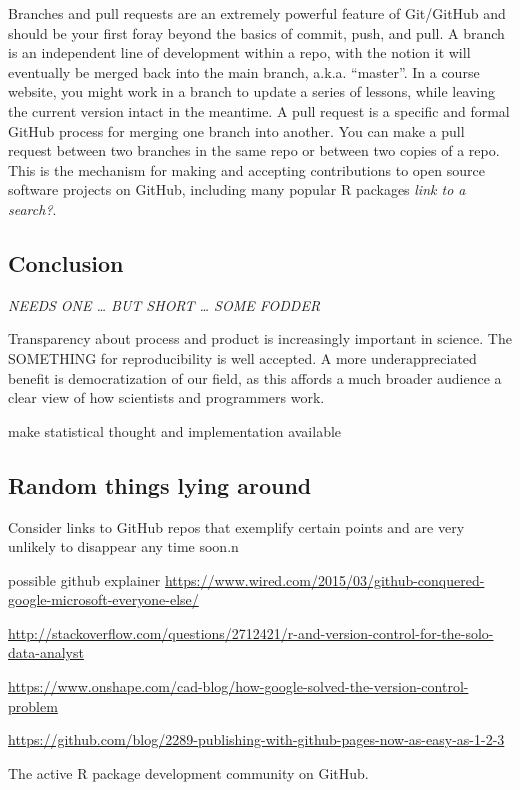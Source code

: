 \documentclass[12pt]{article}
\begin{document}
Branches and pull requests are an extremely powerful feature of
Git/GitHub and should be your first foray beyond the basics of commit,
push, and pull. A branch is an independent line of development within a
repo, with the notion it will eventually be merged back into the main
branch, a.k.a. ``master''. In a course website, you might work in a
branch to update a series of lessons, while leaving the current version
intact in the meantime. A pull request is a specific and formal GitHub
process for merging one branch into another. You can make a pull request
between two branches in the same repo or between two copies of a repo.
This is the mechanism for making and accepting contributions to open
source software projects on GitHub, including many popular R packages
\emph{link to a search?}.

\subsection{Conclusion}\label{conclusion}

\emph{NEEDS ONE \ldots{} BUT SHORT \ldots{} SOME FODDER}

Transparency about process and product is increasingly important in
science. The SOMETHING for reproducibility is well accepted. A more
underappreciated benefit is democratization of our field, as this
affords a much broader audience a clear view of how scientists and
programmers work.

make statistical thought and implementation available

\subsection{Random things lying
around}\label{random-things-lying-around}

Consider links to GitHub repos that exemplify certain points and are
very unlikely to disappear any time soon.n

possible github explainer
\url{https://www.wired.com/2015/03/github-conquered-google-microsoft-everyone-else/}

\url{http://stackoverflow.com/questions/2712421/r-and-version-control-for-the-solo-data-analyst}

\url{https://www.onshape.com/cad-blog/how-google-solved-the-version-control-problem}

\url{https://github.com/blog/2289-publishing-with-github-pages-now-as-easy-as-1-2-3}

The active R package development community on GitHub.
\end{document}
